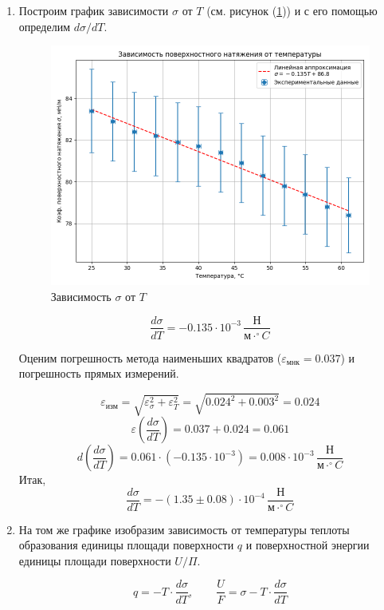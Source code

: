 \documentclass[a4paper,12pt]{article} %
\begin{document}
\begin{enumerate}
  \item Построим график зависимости $\sigma$ от $T$ (см. рисунок (\ref{fig:graph})) и с его помощью определим $d\sigma/dT$. 
  
  \begin{figure}[h]
    \centering
    \includegraphics[scale = 0.75]{graph.png}
    \caption{Зависимость $\sigma$ от $T$}
    \label{fig:graph}
  \end{figure}

  \[ 
    \frac{d\sigma}{dT} = - 0.135 \cdot 10^{-3} \, \frac{\text{Н}}{\text{м}\cdot^{\circ}C}
  \]
  
  Оценим погрешность метода наименьших квадратов ($\varepsilon_\text{мнк} = 0.037$) и погрешность прямых измерений.

  \[ 
    \varepsilon_\text{изм} = \sqrt{\varepsilon_\sigma^2 + \varepsilon_T^2} = \sqrt{0.024^2 + 0.003^2} = 0.024
  \]
  \[
    \varepsilon(\frac{d\sigma}{dT}) = 0.037 + 0.024 = 0.061 
  \]
  \[
    d(\frac{d\sigma}{dT}) = 0.061 \cdot (-0.135 \cdot 10^{-3}) = 0.008 \cdot 10^{-3} \, \frac{\text{Н}}{\text{м}\cdot^{\circ}C}
  \]
  Итак,
  \[
    \frac{d\sigma}{dT} = - (1.35 \pm 0.08) \cdot 10^{-4} \, \frac{\text{Н}}{\text{м}\cdot^{\circ}C}
  \]
  
  \item На том же графике изобразим зависимость от температуры теплоты образования единицы площади поверхности $q$ и поверхностной энергии единицы площади поверхности $U/\Pi$.
  
  \[
    q = -T \cdot \frac{d\sigma}{dT}, \qquad \frac{U}{F} = \sigma - T \cdot \frac{d\sigma}{dT}
  \]


\end{enumerate}
\end{document}
